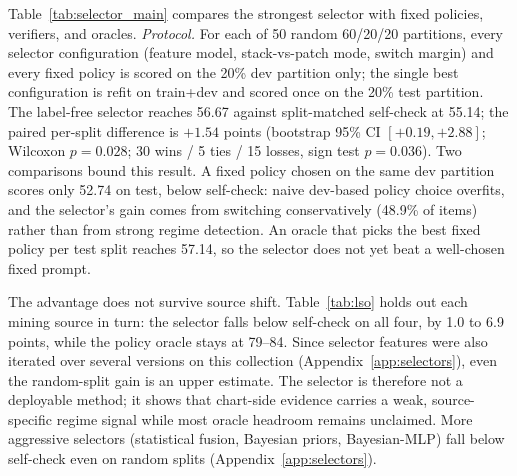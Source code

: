 \begin{table}[t]
\centering
\small
\resizebox{\linewidth}{!}{}
\caption{Deployable selection versus fixed policies and oracles on ScaleQA-Natural-473. ``Label-free'' means no gold subtype or direction feature is used; it does not mean an untouched test set, so we additionally report leave-source-out evaluation. The full ladder of selector variants is in Appendix~\ref{app:selectors}.}
\label{tab:selector_main}
\end{table}

Table~\ref{tab:selector_main} compares the strongest selector with fixed policies, verifiers, and oracles. \emph{Protocol.} For each of 50 random 60/20/20 partitions, every selector configuration (feature model, stack-vs-patch mode, switch margin) and every fixed policy is scored on the 20\% dev partition only; the single best configuration is refit on train+dev and scored once on the 20\% test partition. The label-free selector reaches 56.67 against split-matched self-check at 55.14; the paired per-split difference is $+1.54$ points (bootstrap 95\% CI $[+0.19,+2.88]$; Wilcoxon $p=0.028$; 30 wins / 5 ties / 15 losses, sign test $p=0.036$). Two comparisons bound this result. A fixed policy chosen on the same dev partition scores only 52.74 on test, below self-check: naive dev-based policy choice overfits, and the selector's gain comes from switching conservatively (48.9\% of items) rather than from strong regime detection. An oracle that picks the best fixed policy per test split reaches 57.14, so the selector does not yet beat a well-chosen fixed prompt.

\begin{table}[t]
\centering
\small
\resizebox{\linewidth}{!}{}
\caption{Leave-source-out evaluation of the same selector. Each ChartQA source split that contributed ScaleQA items is held out in turn; configuration is chosen on a dev partition of the remaining sources. The selector is below self-check on every held-out source.}
\label{tab:lso}
\end{table}

The advantage does not survive source shift. Table~\ref{tab:lso} holds out each mining source in turn: the selector falls below self-check on all four, by 1.0 to 6.9 points, while the policy oracle stays at 79--84. Since selector features were also iterated over several versions on this collection (Appendix~\ref{app:selectors}), even the random-split gain is an upper estimate. The selector is therefore not a deployable method; it shows that chart-side evidence carries a weak, source-specific regime signal while most oracle headroom remains unclaimed. More aggressive selectors (statistical fusion, Bayesian priors, Bayesian-MLP) fall below self-check even on random splits (Appendix~\ref{app:selectors}).


